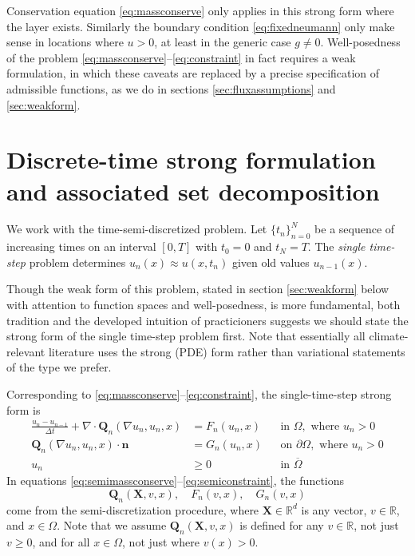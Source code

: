 \documentclass[final,leqno,onefignum,onetabnum]{siamltex1213bueler}
\newcommand\bn{\mathbf{n}}
\newcommand\bQ{\mathbf{Q}}
\newcommand\bX{\mathbf{X}}
\newcommand{\Div}{\nabla\cdot}
\renewcommand{\grad}{\nabla}
\newcommand\RR{\mathbb{R}}
\begin{document}
Conservation equation \eqref{eq:massconserve} only applies in this strong form where the layer exists.  Similarly the boundary condition \eqref{eq:fixedneumann} only make sense in locations where $u>0$, at least in the generic case $g\ne 0$.  Well-posedness of the problem \eqref{eq:massconserve}--\eqref{eq:constraint} in fact requires a weak formulation, in which these caveats are replaced by a precise specification of admissible functions, as we do in sections \ref{sec:fluxassumptions} and \ref{sec:weakform}.


\section{Discrete-time strong formulation and associated set decomposition}  \label{sec:discreteform}

We work with the time-semi-discretized problem.  Let $\{t_n\}_{n=0}^N$ be a sequence of increasing times on an interval $[0,T]$ with $t_0=0$ and $t_N=T$.  The \emph{single time-step} problem determines $u_n(x) \approx u(x,t_n)$ given old values $u_{n-1}(x)$.

Though the weak form of this problem, stated in section \ref{sec:weakform} below with attention to function spaces and well-posedness, is more fundamental, both tradition and the developed intuition of practicioners suggests we should state the strong form of the single time-step problem first.  Note that essentially all climate-relevant literature uses the strong (PDE) form rather than variational statements of the type we prefer.

Corresponding to \eqref{eq:massconserve}--\eqref{eq:constraint}, the single-time-step strong form is
\begin{align}
\frac{u_n - u_{n-1}}{\Delta t} + \Div \bQ_n(\grad u_n,u_n,x) &= F_n(u_n,x) &&\text{in } \Omega, \text{ where } u_n > 0 \label{eq:semimassconserve} \\
\bQ_n(\grad u_n,u_n,x) \cdot \bn &= G_n(u_n,x) &&\text{on } \partial\Omega, \text{ where } u_n > 0 \label{eq:semifixedneumann} \\
u_n &\ge 0 &&\text{in } \overline{\Omega} \label{eq:semiconstraint}
\end{align}
In equations \eqref{eq:semimassconserve}--\eqref{eq:semiconstraint}, the functions
\begin{equation}
\bQ_n(\bX,v,x), \quad F_n(v,x), \quad G_n(v,x)\label{eq:functionalforms}
\end{equation}
come from the semi-discretization procedure, where $\bX\in\RR^d$ is any vector, $v\in\RR$, and $x\in \Omega$.  Note that we assume $\bQ_n(\bX,v,x)$ is defined for any $v\in\RR$, not just $v\ge 0$, and for all $x\in\Omega$, not just where $v(x)>0$.
\end{document}
